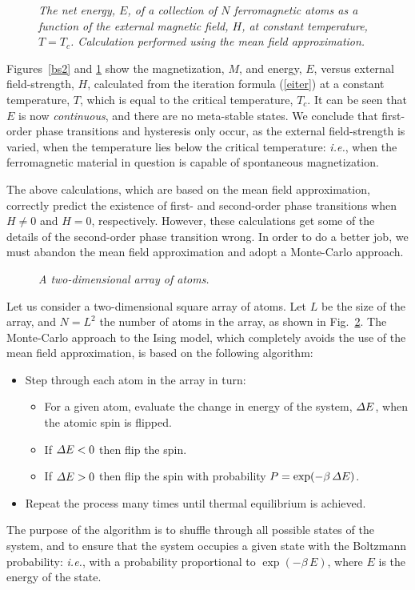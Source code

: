 \begin{figure}
\epsfysize=3in
\centerline{}
\caption{\em  The net energy, $E$, of a collection of $N$ ferromagnetic atoms as a
function of the external magnetic field, $H$, at constant temperature, $T=T_c$.
 Calculation performed using the mean field approximation.}\label{bs1}
\end{figure}

Figures~\ref{bs2} and \ref{bs1} show the magnetization, $M$, and energy, $E$, versus
external field-strength, $H$, calculated from the iteration formula (\ref{eiter})
at a constant temperature, $T$, which is equal to the critical temperature, $T_c$.
 It can be seen that $E$ is now
{\em continuous}, and there are no meta-stable states. We conclude that  first-order
phase transitions and hysteresis only occur, as the external field-strength is varied, when the
temperature lies below the critical temperature: {\em i.e.}, when the ferromagnetic
material in question is capable of spontaneous magnetization.

The above calculations, which are based on the mean field approximation, correctly predict
the existence of first- and second-order phase transitions when $H\neq 0$ and $H=0$,
respectively. However, these calculations get some of the details of the second-order
phase transition  wrong. In order to do a better job, we must abandon the mean
field approximation and
adopt a Monte-Carlo approach.

\begin{figure}
\epsfysize=2in
\centerline{}
\caption{\em  A two-dimensional array of atoms.}\label{farray}
\end{figure}

Let us consider a two-dimensional square array of atoms. Let $L$ be the
size of the array, and $N=L^2$ the number of atoms in the array, as shown in
Fig.~\ref{farray}. The Monte-Carlo approach to the Ising model, which completely avoids
the use of the mean field approximation, is based on the following
algorithm:
\begin{itemize}
\item Step through each atom in the array in turn:
\begin{itemize}
\item For a given atom, evaluate the change in energy of the
system, ${\mit\Delta}E$, when the atomic spin is flipped.
\item If ${\mit\Delta}E<0$ then flip the spin.
\item If ${\mit\Delta}E>0$ then flip the spin with probability $P=\exp(-\beta\,{\mit\Delta}E)$. 
\end{itemize}
\item Repeat the process many times until thermal equilibrium is achieved.
\end{itemize}
The purpose of the algorithm is to shuffle through all  possible states of the
system, and to ensure that the system occupies a given state with the
Boltzmann probability: {\em i.e.}, with a probability proportional
to $\exp(-\beta\,E)$, where $E$ is the energy of the state.


